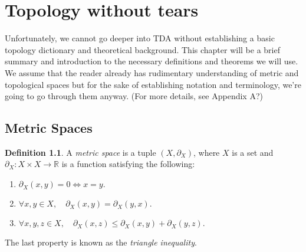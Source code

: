 \chapter{Topology without tears}
\graphicspath{ {/home/tomasp/Dokumenty/Master_Thesis/figures/} }
\theoremstyle{definition}
\newtheorem{definition}{Definition}[section]



Unfortunately, we cannot go deeper into TDA without establishing a basic topology dictionary and theoretical background. This chapter will be a brief summary and introduction to the necessary definitions and theorems we will use. We assume that the reader already has rudimentary understanding of metric and topological spaces but for the sake of establishing notation and terminology, we're going to go through them anyway. (For more details, see Appendix A?)

\section{Metric Spaces}

\begin{definition}
  A \textit{metric space} is a tuple $(X, \partial_{X})$, where $X$ is a set and $\partial_{X}: X \times X \to \mathbb{R}$ is a function satisfying the following:
  \begin{enumerate}[label=\arabic*)]
    \centering
    \item $\partial_{X}(x,y) = 0 \iff x = y.$
    \item $\forall x,y \in X, \quad \partial_{X}(x,y) = \partial_{X}(y,x).$
    \item $\forall x,y,z \in X, \quad \partial_{X}(x,z) \leq \partial_{X}(x,y) + \partial_{X}(y,z).$
  \end{enumerate}
\end{definition}
The last property is known as the \textit{triangle inequality}.
